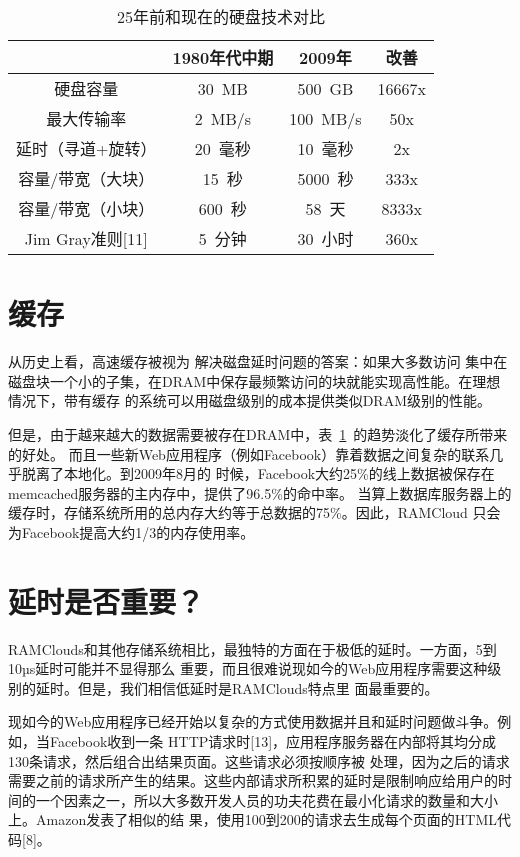 \documentclass[translation]{zjutreport}
\begin{document}
\begin{table}[htbp]
\caption{25年前和现在的硬盘技术对比}\label{tab:table2}
\vspace{0.5em}
\begin{center}
{\wuhao
\begin{tabular}{cccc}
\toprule[1.5pt]
 & 1980年代中期 & 2009年 & 改善\\
\midrule[1pt]
硬盘容量 & 30~MB & 500~GB & 16667x\\
最大传输率 & 2~MB/s & 100~MB/s & 50x \\
延时（寻道+旋转）& 20~毫秒 & 10~毫秒 & 2x \\
容量/带宽（大块） & 15~秒 & 5000~秒 & 333x \\
容量/带宽（小块） & 600~秒 & 58~天 & 8333x \\
Jim Gray准则[11] & 5~分钟 & 30~小时 & 360x \\
\bottomrule[1.5pt]
\end{tabular}}
\end{center}
\vspace{\baselineskip}
\end{table}

\section{缓存}
从历史上看，高速缓存被视为
解决磁盘延时问题的答案：如果大多数访问
集中在磁盘块一个小的子集，在DRAM中保存最频繁访问的块就能实现高性能。在理想情况下，带有缓存
的系统可以用磁盘级别的成本提供类似DRAM级别的性能。

但是，由于越来越大的数据需要被存在DRAM中，表~\ref{tab:table2}~的趋势淡化了缓存所带来的好处。
而且一些新Web应用程序（例如Facebook）靠着数据之间复杂的联系几乎脱离了本地化。到2009年8月的
时候，Facebook大约25\%的线上数据被保存在memcached服务器的主内存中，提供了96.5\%的命中率。
当算上数据库服务器上的缓存时，存储系统所用的总内存大约等于总数据的75\%。因此，RAMCloud
只会为Facebook提高大约1/3的内存使用率。

\section{延时是否重要？}
RAMClouds和其他存储系统相比，最独特的方面在于极低的延时。一方面，5到10µs延时可能并不显得那么
重要，而且很难说现如今的Web应用程序需要这种级别的延时。但是，我们相信低延时是RAMClouds特点里
面最重要的。

现如今的Web应用程序已经开始以复杂的方式使用数据并且和延时问题做斗争。例如，当Facebook收到一条
HTTP请求时[13]，应用程序服务器在内部将其均分成130条请求，然后组合出结果页面。这些请求必须按顺序被
处理，因为之后的请求需要之前的请求所产生的结果。这些内部请求所积累的延时是限制响应给用户的时
间的一个因素之一，所以大多数开发人员的功夫花费在最小化请求的数量和大小上。Amazon发表了相似的结
果，使用100到200的请求去生成每个页面的HTML代码[8]。
\end{document}
